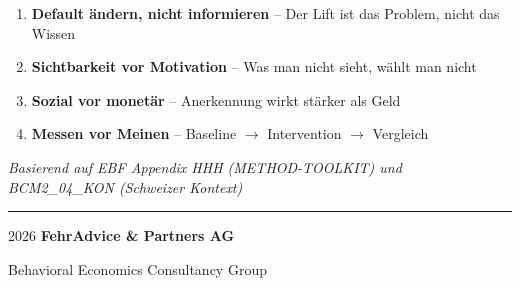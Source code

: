 \documentclass[11pt,a4paper]{article}
\begin{document}
\vspace{1cm}

\begin{tcolorbox}[fainfobox={Die wichtigsten Prinzipien}]
\begin{enumerate}
    \item \textbf{Default ändern, nicht informieren} -- Der Lift ist das Problem, nicht das Wissen
    \item \textbf{Sichtbarkeit vor Motivation} -- Was man nicht sieht, wählt man nicht
    \item \textbf{Sozial vor monetär} -- Anerkennung wirkt stärker als Geld
    \item \textbf{Messen vor Meinen} -- Baseline $\rightarrow$ Intervention $\rightarrow$ Vergleich
\end{enumerate}
\end{tcolorbox}

\vfill

\begin{center}
\textit{Basierend auf EBF Appendix HHH (METHOD-TOOLKIT) und BCM2\_04\_KON (Schweizer Kontext)}

\vspace{0.5cm}

{\color{fadarkblue}\rule{0.5\textwidth}{1pt}}

\vspace{0.5cm}

\textcopyright{} 2026 \textbf{\color{fadarkblue}FehrAdvice \& Partners AG}

\vspace{0.3cm}

{\small\color{fadarkgray}Behavioral Economics Consultancy Group}
\end{center}
\end{document}
